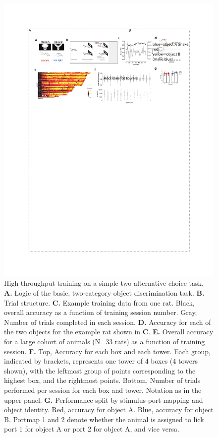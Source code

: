 \begin{figure}[t!]
    \includegraphics[width=\textwidth]{figures/chapter_1/fig_1-2_basic_training/fig_1-2_basic_training.pdf}
    \vspace{.1in}
    \caption[High-throughput training]{High-throughput training on a simple two-alternative choice task. \textbf{A.} Logic of the basic, two-category object discrimination task. \textbf{B.} Trial structure. \textbf{C.} Example training data from one rat. Black, overall accuracy as a function of training session number. Gray, Number of trials completed in each session. \textbf{D.} Accuracy for each of the two objects for the example rat shown in \textbf{C}. \textbf{E.} Overall accuracy for a large cohort of animals (N=33 rats) as a function of training session. \textbf{F.} Top, Accuracy for each box and each tower. Each group, indicated by brackets, represents one tower of 4 boxes (4 towers shown), with the leftmost group of points corresponding to the highest box, and the rightmost points. Bottom, Number of trials performed per session for each box and tower. Notation as in the upper panel. \textbf{G.} Performance split by stimulus-port mapping and object identity. Red, accuracy for object A. Blue, accuracy for object B. Portmap 1 and 2 denote whether the animal is assigned to lick port 1 for object A or port 2 for object A, and vice versa.
    \label{fig:basic_training}}
\end{figure}

